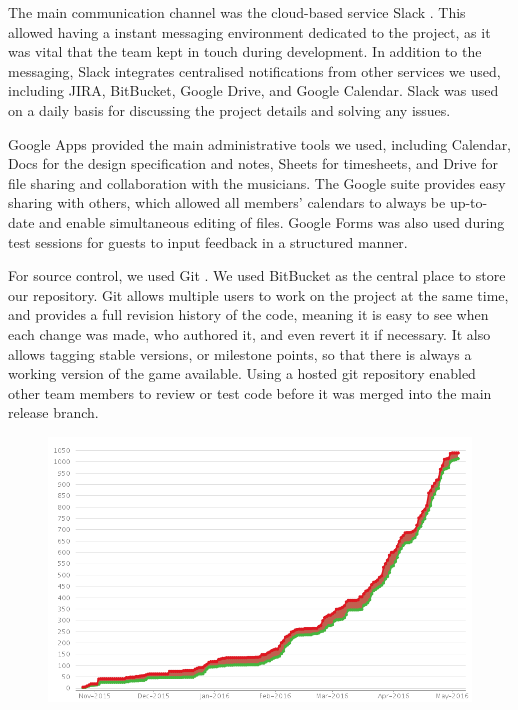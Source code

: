 \documentclass[a4paper,11pt]{article}
\begin{document}
The main communication channel was the cloud-based service Slack \cite{slack}. This allowed having a instant messaging environment dedicated to the project, as it was vital that the team kept in touch during development. In addition to the messaging, Slack integrates centralised notifications from other services we used, including JIRA, BitBucket, Google Drive, and Google Calendar. Slack was used on a daily basis for discussing the project details and solving any issues.

Google Apps \cite{google_apps} provided the main administrative tools we used, including Calendar, Docs for the design specification and notes, Sheets for timesheets, and Drive for file sharing and collaboration with the 
musicians. The Google suite provides easy sharing with others, which allowed all members’ calendars to always be up-to-date and enable simultaneous editing of files. Google Forms was also used during test sessions for guests to input feedback in a structured manner.

For source control, we used Git \cite{git}. We used BitBucket \cite{bitbucket} as the central place to store our repository. Git allows multiple users to work on the project at the same time, and provides a full revision history of the code, meaning it is easy to see when each change was made, who authored it, and even revert it if necessary. It also allows tagging stable versions, or milestone points, so that there is always a working version of the game available. Using a hosted git repository enabled other team members to review or test code before it was merged into the main release branch.

\begin{figure}[ht]
	\centering
    \includegraphics[width=.75\textwidth]{jira_open_vs_closed}
\end{figure}
\end{document}
